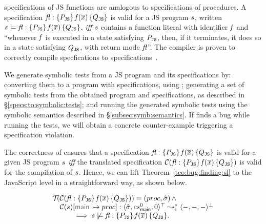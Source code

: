 \javert specifications of JS functions are analogous to \jsil specifications of \jsil procedures.
A \javert specification ${\mathit{fl}} : \{ P_{\mathtt{JS}} \} \, \mathit{f}(\overline{x}) \, \{ Q_{\mathtt{JS}} \}$
is valid for a JS program $s$, written $s \models {\ensuremath{\mathit{fl}}} : \{ P_{\mathtt{JS}} \} \, \mathit{f}(\overline{x}) \, \{ Q_{\mathtt{JS}} \}$, 
\emph{iff} $s$ contains a function literal with identifier $\mathit{f}$ and ``whenever $\mathit{f}$ is executed in a state satisfying $P_{\mathtt{JS}}$, then, 
if it terminates, it does so in a state satisfying $Q_{\mathtt{JS}}$, with return mode $\mathit{fl}$''. 
The \JSComp compiler is proven to correctly compile \javert specfications to \jsil specifications~\cite{javert}.


We generate symbolic tests from a JS program and its \javert specifications by: converting them to a \jsil program with \jsil specifications, using \jstojsil; generating a set of symbolic tests from the obtained \jsil program and \jsil specifications, as described in \S\ref{specs:to:symbolic:tests}; and running the generated \jsil symbolic tests using the \jsil symbolic semantics described in \S\ref{subsec:symb:semantics}. 
If \cosette finds a bug while running the tests, we will obtain a concrete counter-example triggering a specification violation.

The correctness of \JSComp ensures that 
%
 a \javert  specification ${\mathit{fl}} : \{ P_{\mathtt{JS}} \} \, \mathit{f}(\overline{x}) \, \{ Q_{\mathtt{JS}} \}$
is valid for a given JS program $s$ \emph{iff} the translated specification 
$\mathcal{C}({\mathit{fl}} : \{ P_{\mathtt{JS}} \} \, \mathit{f}(\overline{x}) \, \{ Q_{\mathtt{JS}} \})$ is valid 
for the compilation of $s$.
Hence, we can lift Theorem~\ref{teo:bug:finding:sl} to the JavaScript level in a straightforward way, 
as shown below. 

\begin{corollary}\label{teo:bug:finding:sl:javert}
$$
\begin{array}{l}
\testify{}(\compile(\specsig{\pass_\jssubscript}{\pid(\jvec{x})}{\qass_\jssubscript}{\flag}))  = (\proc, \sstate) \, \wedge \\
\quad
  \compile(\jstmt)[\jsilmain \mapsto \proc] :  \transabssemrule{\sstate, \csmain, 0}{-, -, -}{\top}{\bot}{\symbolic} \\ \quad \qquad 
    \implies  
         \jstmt \not\satisfies \specsig{\pass_\jssubscript}{\pid(\jvec{x})}{\qass_\jssubscript}{\flag}.
\end{array}
$$
\end{corollary}


